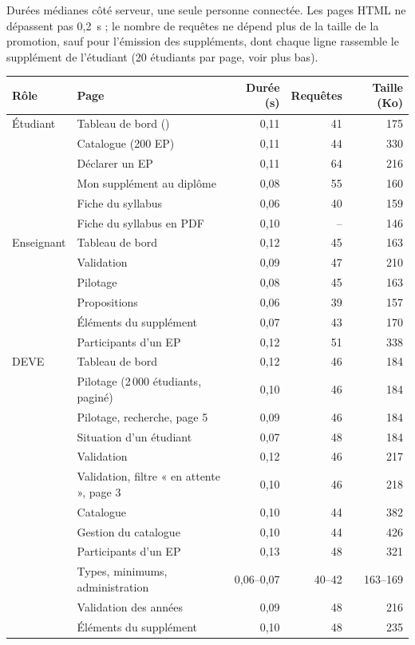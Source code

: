 \documentclass[11pt,a4paper]{article}
\newcommand{\code}[1]{\texttt{\detokenize{#1}}}
\begin{document}
Durées médianes côté serveur, une seule personne connectée. Les pages HTML ne dépassent pas
0,2~s ; le nombre de requêtes ne dépend plus de la taille de la promotion, sauf pour l'émission
des suppléments, dont chaque ligne rassemble le supplément de l'étudiant (20 étudiants par page,
voir plus bas).

\begin{longtable}{@{}p{1.9cm}p{7.6cm}RRR@{}}
\toprule
\textbf{Rôle} & \textbf{Page} & \textbf{Durée (s)} & \textbf{Requêtes} & \textbf{Taille (Ko)} \\
\midrule\endhead
Étudiant & Tableau de bord (\code{view.php}) & 0,11 & 41 & 175 \\
 & Catalogue (200 EP) & 0,11 & 44 & 330 \\
 & Déclarer un EP & 0,11 & 64 & 216 \\
 & Mon supplément au diplôme & 0,08 & 55 & 160 \\
 & Fiche du syllabus & 0,06 & 40 & 159 \\
 & Fiche du syllabus en PDF & 0,10 & -- & 146 \\
Enseignant & Tableau de bord & 0,12 & 45 & 163 \\
 & Validation & 0,09 & 47 & 210 \\
 & Pilotage & 0,08 & 45 & 163 \\
 & Propositions & 0,06 & 39 & 157 \\
 & Éléments du supplément & 0,07 & 43 & 170 \\
 & Participants d'un EP & 0,12 & 51 & 338 \\
DEVE & Tableau de bord & 0,12 & 46 & 184 \\
 & Pilotage (2\,000 étudiants, paginé) & 0,10 & 46 & 184 \\
 & Pilotage, recherche, page 5 & 0,09 & 46 & 184 \\
 & Situation d'un étudiant & 0,07 & 48 & 184 \\
 & Validation & 0,12 & 46 & 217 \\
 & Validation, filtre « en attente », page 3 & 0,10 & 46 & 218 \\
 & Catalogue & 0,10 & 44 & 382 \\
 & Gestion du catalogue & 0,10 & 44 & 426 \\
 & Participants d'un EP & 0,13 & 48 & 321 \\
 & Types, minimums, administration & 0,06--0,07 & 40--42 & 163--169 \\
 & Validation des années & 0,09 & 48 & 216 \\
 & Éléments du supplément & 0,10 & 48 & 235 \\

\end{longtable}
\end{document}
